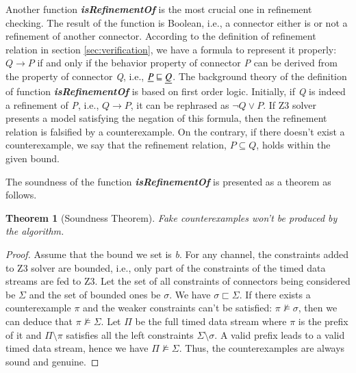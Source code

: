 \documentclass[preprint,3p]{elsarticle}
\newtheorem{theorem}{Theorem}[section]
\begin{document}
Another function \textbf{\emph{isRefinementOf}} is the most crucial one in refinement checking. The result of the function is Boolean, i.e., a connector either is or not a refinement of another connector. According to the definition of refinement relation in section \ref{sec:verification}, we have a formula to represent it properly: $Q \rightarrow P$ if and only if the behavior property of connector \emph{P} can be derived from the property of connector \emph{Q}, i.e., $\emph{P} \sqsubseteq \emph{Q}$. The background theory of the definition of function  \textbf{\emph{isRefinementOf}} is based on first order logic. Initially, if \emph{Q} is indeed a refinement of \emph{P}, i.e., $Q \rightarrow P$, it can be rephrased as $\neg Q \vee P$. If Z3 solver presents a model satisfying the negation of this formula, then the refinement relation is falsified by a counterexample. On the contrary, if there doesn't exist a counterexample, we say that the refinement relation, $P\subseteq Q$, holds within the given bound.

The soundness of the function \textbf{\emph{isRefinementOf}} is presented as a theorem as follows.
\begin{theorem}[Soundness Theorem]
Fake counterexamples won't be produced by the algorithm.
\end{theorem}

\begin{proof}
Assume that the bound we set is \emph{b}. For any channel, the constraints added to Z3 solver are bounded, i.e., only part of the constraints of the timed data streams are fed to Z3. Let the set of all constraints of connectors being considered be $\Sigma$ and the set of bounded ones be $\sigma$. We have $\sigma \sqsubset \Sigma$. If there exists a counterexample $\pi$ and the weaker constraints can't be satisfied: $\pi \nvDash \sigma$, then we can deduce that $\pi \nvDash \Sigma$. Let $\Pi$ be the full timed data stream where $\pi$ is the prefix of it and $\Pi \setminus \pi$ satisfies all the left constraints $\Sigma \setminus \sigma$.
A valid prefix leads to a valid timed data stream, hence we have $\Pi \nvDash \Sigma$.
Thus, the counterexamples are always sound and genuine.
\end{proof}
\end{document}
